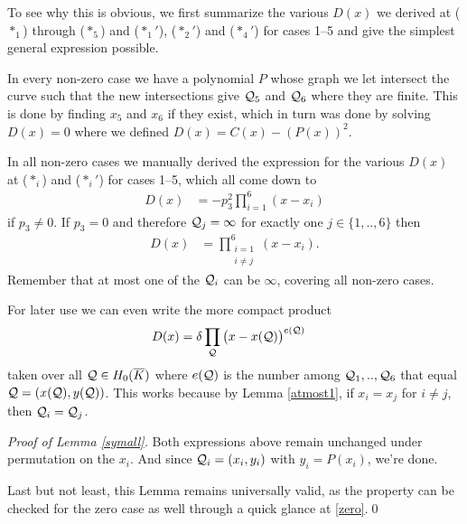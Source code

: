 \documentclass[english,11pt,a4paper]{article}
\begin{document}
To see why this is obvious, we first summarize the various $D(x)$ we derived at ($*_1$) through ($*_5$) and ($*_1'$), ($*_2'$) and ($*_4'$) for cases 1--5 and give the simplest general expression possible.

\begin{remark}\label{remD}
  In every non-zero case we have a polynomial $P$ whose graph we let intersect the curve such that the new intersections give $\mathcal{Q}_5$ and $\mathcal{Q}_6$ where they are finite. This is done by finding $x_5$ and $x_6$ if they exist, which in turn was done by solving $D(x) = 0$ where we defined $D(x) = C(x) - (P(x))^2$.

  In all non-zero cases we manually derived the expression for the various $D(x)$ at ($*_i$) and ($*_i'$) for cases 1--5, which all come down to
  \begin{align*}
    D(x) &= -p_3^2\prod_{i=1}^6(x-x_i)
  \end{align*}
  if $p_3 \neq 0$. If $p_3 = 0$ and therefore $\mathcal{Q}_j = \infty$ for exactly one $j \in \{1,..,6\}$ then
  \begin{align*}
    D(x) &=  \prod_{\substack{i=1\\i \neq j}}^6(x-x_i).
  \end{align*}
  Remember that at most one of the $\mathcal{Q}_i$ can be $\infty$, covering all non-zero cases.

  For later use we can even write the more compact product
  \begin{align*}
    D(x) &= \delta \prod_{\mathcal{Q}} \big(x-x(\mathcal{Q})\big)^{e(\mathcal{Q})}
  \end{align*}
  taken over all $\mathcal{Q}  \in H_0(\overline K)$ where $e(\mathcal{Q})$ is the number among $\mathcal{Q}_1,..,\mathcal{Q}_6$ that equal $\mathcal{Q} = (x(\mathcal{Q}), y(\mathcal{Q}))$. This works because by Lemma \ref{atmost1}, if $x_i = x_j$ for $i \neq j$, then $\mathcal{Q}_i = \mathcal{Q}_j$.
\end{remark}

\emph{Proof of Lemma \ref{symall}.}
  Both expressions above remain unchanged under permutation on the $x_i$. And since $\mathcal{Q}_i = (x_i, y_i)$ with $y_i = P(x_i)$, we're done.

  Last but not least, this Lemma remains universally valid, as the property can be checked for the zero case as well through a quick glance at \eqref{zero}.\hfill \qed



\end{document}
